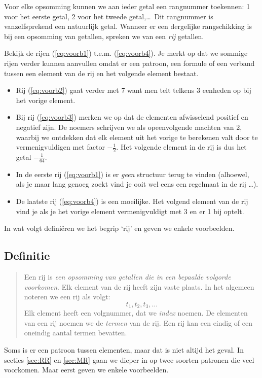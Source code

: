 Voor elke opsomming kunnen we aan ieder getal een rangnummer
toekennen: 1 voor het eerste getal, 2 voor het tweede getal,\ldots\ Dit
rangnummer is vanzelfsprekend een natuurlijk getal. Wanneer er een
dergelijke rangschikking is bij een opsomming van getallen,
spreken we van een \textit{rij} getallen. 

Bekijk de rijen
(\ref{eq:voorb1})
t.e.m. (\ref{eq:voorb4}). Je
merkt op dat we sommige rijen verder kunnen aanvullen omdat er een patroon, een
formule of een verband tussen een element van de rij en het
volgende element bestaat.
\begin{itemize}
    \item  Rij (\ref{eq:voorb2}) gaat verder met  $7$ want men telt
telkens 3 eenheden op  bij het vorige element.

    \item  Bij rij (\ref{eq:voorb3}) merken we op dat de elementen
    afwisselend positief en negatief zijn.
De noemers  schrijven we als opeenvolgende machten van 2, waarbij we
ontdekken dat elk element uit het vorige te berekenen valt door te
vermenigvuldigen met factor $-\frac{1}{2}$. Het volgende element in de rij is dus het getal $-\frac{1}{64}$.
\item In de eerste rij (\ref{eq:voorb1}) is er \emph{geen} structuur terug te vinden (alhoewel, als je maar lang genoeg zoekt vind je ooit wel eens een regelmaat in de rij \ldots).
\item De laatste rij (\ref{eq:voorb4}) is een moeilijke. Het volgend element van de rij vind je als je het vorige element vermenigvuldigt  met 3 en er 1 bij optelt.
\end{itemize}

In wat volgt defini\"eren we het begrip `rij' en geven we enkele voorbeelden.


\subsection{Definitie}


\begin{quote}
    Een rij is \emph{een opsomming van  getallen die in een bepaalde volgorde voorkomen}. Elk element van de rij heeft zijn vaste plaats. In het algemeen noteren we een rij als volgt:
    \[
    t_1, t_2, t_3, \dots
    \]
    Elk element heeft een volgnummer, dat we \textit{index} noemen. De elementen van een rij noemen we de \textit{termen} van de rij. Een rij kan een eindig of een oneindig aantal termen bevatten. 
    \end{quote}
Soms is er een patroon tussen elementen, maar dat is niet altijd het geval. In secties \ref{sec:RR} en \ref{sec:MR} gaan we dieper in op twee soorten patronen die veel voorkomen. Maar eerst geven we enkele voorbeelden.


